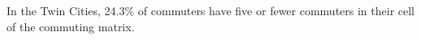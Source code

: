 In the Twin Cities, 24.3\% of commuters have five or fewer commuters in their cell of the commuting matrix.
